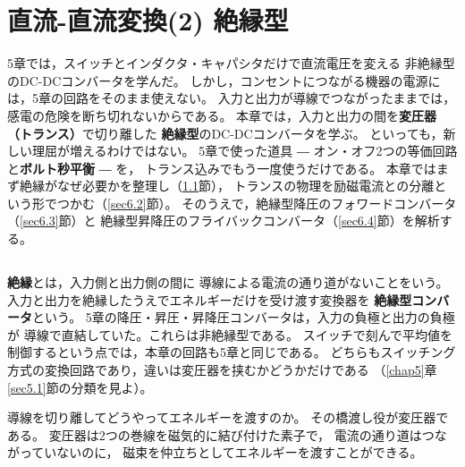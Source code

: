 \chapter{直流-直流変換(2) 絶縁型}
\label{chap6}

5章では，スイッチとインダクタ・キャパシタだけで直流電圧を変える
非絶縁型のDC-DCコンバータを学んだ。
しかし，コンセントにつながる機器の電源には，5章の回路をそのまま使えない。
入力と出力が導線でつながったままでは，感電の危険を断ち切れないからである。
本章では，入力と出力の間を\textbf{変圧器（トランス）}で切り離した
\textbf{絶縁型}のDC-DCコンバータを学ぶ。
といっても，新しい理屈が増えるわけではない。
5章で使った道具 ― オン・オフ2つの等価回路と\textbf{ボルト秒平衡} ― を，
トランス込みでもう一度使うだけである。
本章ではまず絶縁がなぜ必要かを整理し（\ref{sec6.1}節），
トランスの物理を励磁電流との分離という形でつかむ（\ref{sec6.2}節）。
そのうえで，絶縁型降圧のフォワードコンバータ（\ref{sec6.3}節）と
絶縁型昇降圧のフライバックコンバータ（\ref{sec6.4}節）を解析する。

\section{}
\label{sec6.1}

\subsection{}

\textbf{絶縁}とは，入力側と出力側の間に
導線による電流の通り道がないことをいう。
入力と出力を絶縁したうえでエネルギーだけを受け渡す変換器を
\textbf{絶縁型コンバータ}という。
5章の降圧・昇圧・昇降圧コンバータは，入力の負極と出力の負極が
導線で直結していた。これらは非絶縁型である。
スイッチで刻んで平均値を制御するという点では，本章の回路も5章と同じである。
どちらもスイッチング方式の変換回路であり，違いは変圧器を挟むかどうかだけである
（\ref{chap5}章\ref{sec5.1}節の分類を見よ）。

導線を切り離してどうやってエネルギーを渡すのか。
その橋渡し役が変圧器である。
変圧器は2つの巻線を磁気的に結び付けた素子で，
電流の通り道はつながっていないのに，
磁束を仲立ちとしてエネルギーを渡すことができる。

